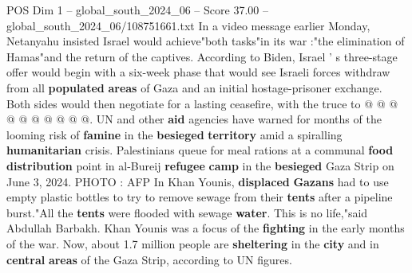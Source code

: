 \begin{textsample}{POS Dim 1 – global\_south\_2024\_06 – Score 37.00 – global\_south\_2024\_06/108751661.txt}
In a video message earlier Monday, Netanyahu insisted Israel would achieve"both tasks"in its war :"the elimination of Hamas"and the return of the captives.
According to Biden, Israel ' s three-stage offer would begin with a six-week phase that would see Israeli forces withdraw from all \textbf{populated} \textbf{areas} of Gaza and an initial hostage-prisoner exchange.
Both sides would then negotiate for a lasting ceasefire, with the truce to @ @ @ @ @ @ @ @ @ @.
UN and other \textbf{aid} agencies have warned for months of the looming risk of \textbf{famine} in the \textbf{besieged} \textbf{territory} amid a spiralling \textbf{humanitarian} crisis.
Palestinians queue for meal rations at a communal \textbf{food} \textbf{distribution} point in al-Bureij \textbf{refugee} \textbf{camp} in the \textbf{besieged} Gaza Strip on June 3, 2024.
PHOTO : AFP In Khan Younis, \textbf{displaced} \textbf{Gazans} had to use empty plastic bottles to try to remove sewage from their \textbf{tents} after a pipeline burst."All the \textbf{tents} were flooded with sewage \textbf{water}.
This is no life,"said Abdullah Barbakh.
Khan Younis was a focus of the \textbf{fighting} in the early months of the war.
Now, about 1.7 million people are \textbf{sheltering} in the \textbf{city} and in \textbf{central} \textbf{areas} of the Gaza Strip, according to UN figures.

\end{textsample}
